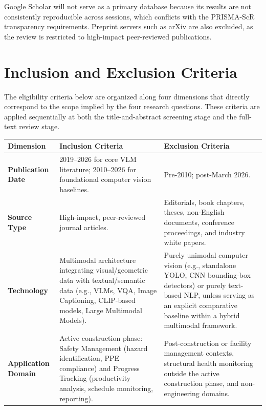 \documentclass[12pt, letterpaper]{article}
\begin{document}
Google Scholar will not serve as a primary database because its results are not
consistently reproducible across sessions, which conflicts with the PRISMA-ScR
transparency requirements. Preprint servers such as arXiv are also excluded,
as the review is restricted to high-impact peer-reviewed publications.

\section{Inclusion and Exclusion Criteria}

The eligibility criteria below are organized along four dimensions that directly
correspond to the scope implied by the four research questions. These criteria
are applied sequentially at both the title-and-abstract screening stage and the
full-text review stage.

\vspace{8pt}
\begin{singlespace}
\small
\renewcommand{\arraystretch}{1.55}
\begin{tabularx}{\textwidth}{>{\bfseries}p{2.3cm} X X}
\toprule
\textbf{Dimension} & \textbf{Inclusion Criteria} & \textbf{Exclusion Criteria} \\
\midrule
Publication Date
  & 2019--2026 for core VLM literature; 2010--2026 for foundational
    computer vision baselines.
  & Pre-2010; post-March 2026. \\
\midrule
Source Type
  & High-impact, peer-reviewed journal articles.
  & Editorials, book chapters, theses, non-English documents,
    conference proceedings, and industry white papers. \\
\midrule
Technology
  & Multimodal architecture integrating visual/geometric data with
    textual/semantic data (e.g., VLMs, VQA, Image Captioning,
    CLIP-based models, Large Multimodal Models).
  & Purely unimodal computer vision (e.g., standalone YOLO, CNN
    bounding-box detectors) or purely text-based NLP, unless serving
    as an explicit comparative baseline within a hybrid multimodal
    framework. \\
\midrule
Application Domain
  & Active construction phase: Safety Management (hazard identification,
    PPE compliance) and Progress Tracking (productivity analysis,
    schedule monitoring, reporting).
  & Post-construction or facility management contexts, structural health
    monitoring outside the active construction phase, and
    non-engineering domains. \\
\bottomrule
\end{tabularx}
\end{singlespace}
\end{document}
